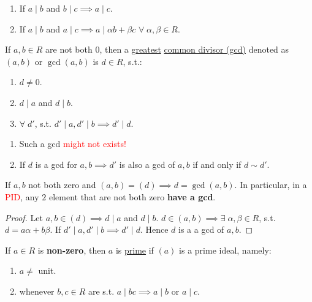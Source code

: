 \begin{proposition}
	\leavevmode
	\begin{enumerate}
		\item If \( a\mid b \) and \( b\mid c\implies a\mid c \).
		\item If \( a\mid b \) and \( a\mid c \implies a\mid \alpha b + \beta c \) \( \forall \; \alpha, \beta \in R \).
	\end{enumerate}
\end{proposition}

\begin{definition}
	If \( a,b \in R \) are not both \( 0 \), then a \underline{greatest} \underline{common divisor (gcd)} denoted as \( (a,b) \) or \( \gcd(a,b) \) is \( d\in R \), s.t.:
	\begin{enumerate}
		\item \( d\ne 0 \).
		\item \( d\mid a \) and \( d\mid b \).
		\item \( \forall \; d' \), s.t. \( d'\mid a, d'\mid b \implies d'\mid d \).
	\end{enumerate}
\end{definition}

\begin{note}
	\leavevmode
	\begin{enumerate}
		\item Such a gcd \textcolor{red}{might not exists!}
		\item If \( d \) is a gcd for \( a,b \implies d'\) is also a gcd of \( a,b \) if and only if \( d\sim d' \).
	\end{enumerate}
\end{note}

\begin{proposition}
	If \( a,b \) not both zero and \( (a,b) = (d) \implies d = \gcd (a,b)\). In particular, in a \textcolor{red}{PID}, any \( 2 \) element that are not both zero \textbf{have a gcd}.
\end{proposition}

\begin{proof}
	Let \( a,b \in (d) \implies d\mid a\) and \( d\mid b \). \( d\in (a,b) \implies \exists \; \alpha, \beta \in R \), s.t. \( d = a\alpha + b\beta \). If \( d'\mid a, d'\mid b \implies d'\mid d \). Hence \( d \) is a a gcd of \( a,b \).
\end{proof}

\begin{definition}
	If \( a\in R \) is \textbf{non-zero}, then \( a \) is \underline{prime} if \( (a) \) is a prime ideal, namely:
	\begin{enumerate}
		\item \( a\ne \) unit.
		\item whenever \( b,c \in R \) are s.t. \( a\mid bc \implies a\mid b \) or \( a\mid c \).
	\end{enumerate}
\end{definition}

